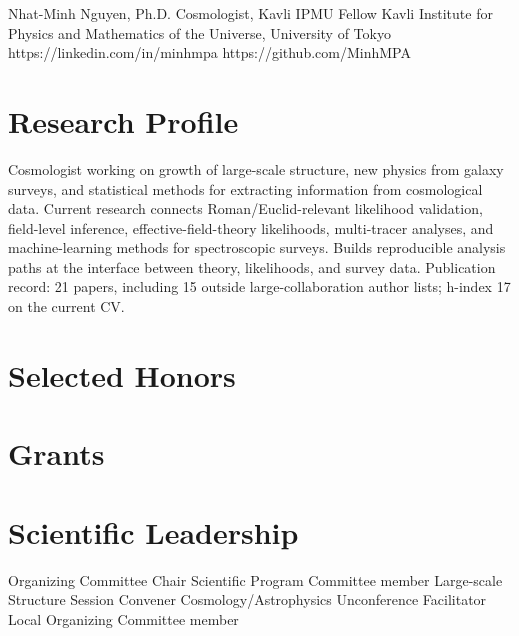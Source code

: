 



\cvheader
  {Nhat-Minh Nguyen, Ph.D.}
  {Cosmologist, Kavli IPMU Fellow}
  {Kavli Institute for Physics and Mathematics of the Universe, University of Tokyo}
  {https://linkedin.com/in/minhmpa}
  {https://github.com/MinhMPA}

\section*{Research Profile}
Cosmologist working on growth of large-scale structure, new physics from galaxy surveys, and statistical methods for extracting information from cosmological data. Current research connects Roman/Euclid-relevant likelihood validation, field-level inference, effective-field-theory likelihoods, multi-tracer analyses, and machine-learning methods for spectroscopic surveys. Builds reproducible analysis paths at the interface between theory, likelihoods, and survey data. Publication record: 21 papers, including 15 outside large-collaboration author lists; h-index 17 on the current CV.

\section*{Selected Honors}

\section*{Grants}

\section*{Scientific Leadership}
  {Organizing Committee Chair}{}
  {Scientific Program Committee member}{}
  {Large-scale Structure Session Convener}{}
  {Cosmology/Astrophysics Unconference Facilitator}{}
  {Local Organizing Committee member}{}

